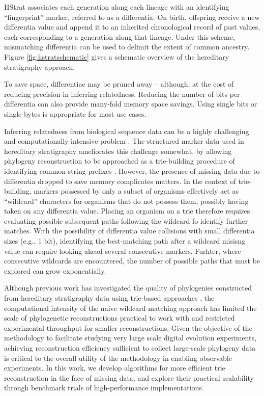 HStrat associates each generation along each lineage with an identifying ``fingerprint'' marker, referred to as a differentia.
On birth, offspring receive a new differentia value and append it to an inherited chronological record of past values, each corresponding to a generation along that lineage.
Under this scheme, mismatching differentia can be used to delimit the extent of common ancestry.
Figure \ref{fig:hstratschematic} gives a schematic overview of the hereditary stratigraphy approach.

To save space, differentiae may be pruned away -- although, at the cost of reducing precision in inferring relatedness.
Reducing the number of bits per differentia can also provide many-fold memory space savings.
Using single bits or single bytes is appropriate for most use cases.

Inferring relatedness from biological sequence data can be a highly challenging and computationally-intensive problem \citep{TODO}.
The structured marker data used in hereditary stratigraphy ameliorates this challenge somewhat, by allowing phylogeny reconstruction to be approached as a trie-building procedure of identifying common string prefixes \citep{TODO}.
However, the presence of missing data due to differentia dropped to save memory complicates matters.
In the context of trie-building, markers possessed by only a subset of organisms effectively act as ``wildcard'' characters for organisms that do not possess them, possibly having taken on any differentia value.
Placing an organism on a trie therefore requires evaluating possible subsequent paths following the wildcard fo identify further matches.
With the possibility of differentia value collisions with small differentia sizes (e.g., 1 bit), identifying the best-matching path after a wildcard misisng value can require looking ahead several consecutive markers.
Furhter, where consecutive wildcards are encountered, the number of possible paths that must be explored can grow exponentially.


Although previous work has investigated the quality of phylogenies constructed from hereditary stratigraphy data using trie-based approaches \citep{moreno2025testing}, the computational intensity of the naive wildcard-matching approach has limited the scale of phylogenetic reconstructions practical to work with and restricted experimental throughput for smaller reconstructions.
Given the objective of the methodology to facilitate studying very large scale digital evolution experiments, achieving reconstruction efficiency sufficient to collect large-scale phylogeny data is critical to the overall utility of the methodology in enabling observable experiments.
In this work, we develop algorithms for more efficient trie reconstruction in the face of missing data, and explore their practical scalability through benchmark trials of high-performance implementations.


